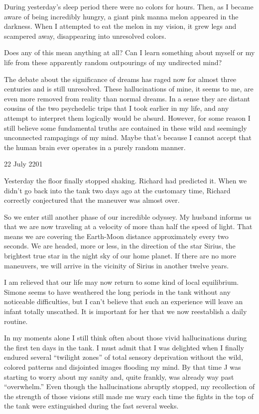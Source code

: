 \documentclass[]{article}
\begin{document}
During yesterday’s sleep period there were no colors for hours. Then, as I became aware of being incredibly hungry, a giant pink manna melon appeared in the darkness. When I attempted to eat the melon in my vision, it grew legs and scampered away, disappearing into unresolved colors.

Does any of this mean anything at all? Can I learn something about myself or my life from these apparently random outpourings of my undirected mind?

The debate about the significance of dreams has raged now for almost three centuries and is still unresolved. These hallucinations of mine, it seems to me, are even more removed from reality than normal dreams. In a sense they are distant cousins of the two psychedelic trips that I took earlier in my life, and any attempt to interpret them logically would be absurd. However, for some reason I still believe some fundamental truths are contained in these wild and seemingly unconnected rampagings of my mind. Maybe that’s because I cannot accept that the human brain ever operates in a purely random manner.

22 July 2201

Yesterday the floor finally stopped shaking. Richard had predicted it. When we didn’t go back into the tank two days ago at the customary time, Richard correctly conjectured that the maneuver was almost over.

So we enter still another phase of our incredible odyssey. My husband informs us that we are now traveling at a velocity of more than half the speed of light. That means we are covering the Earth-Moon distance approximately every two seconds. We are headed, more or less, in the direction of the star Sirius, the brightest true star in the night sky of our home planet. If there are no more maneuvers, we will arrive in the vicinity of Sirius in another twelve years.

I am relieved that our life may now return to some kind of local equilibrium. Simone seems to have weathered the long periods in the tank without any noticeable difficulties, but I can’t believe that such an experience will leave an infant totally unscathed. It is important for her that we now reestablish a daily routine.

In my moments alone I still think often about those vivid hallucinations during the first ten days in the tank. I must admit that I was delighted when I finally endured several “twilight zones” of total sensory deprivation without the wild, colored patterns and disjointed images flooding my mind. By that time J was starting to worry about my sanity and, quite frankly, was already way past “overwhelm.” Even though the hallucinations abruptly stopped, my recollection of the strength of those visions still made me wary each time the fights in the top of the tank were extinguished during the fast several weeks.
\end{document}
